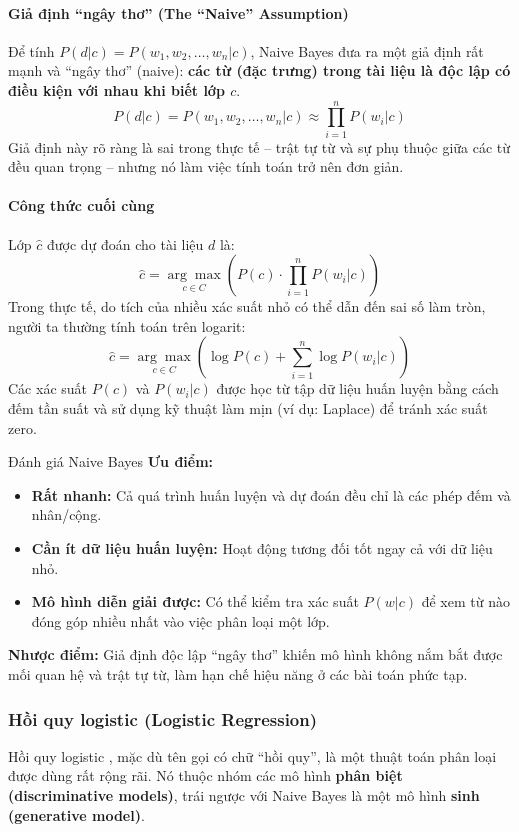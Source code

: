 \paragraph{Giả định “ngây thơ” (The “Naive” Assumption)}
Để tính $P(d|c) = P(w_1, w_2, \dots, w_n | c)$, Naive Bayes đưa ra một giả định rất mạnh và “ngây thơ” (naive): \textbf{các từ (đặc trưng) trong tài liệu là độc lập có điều kiện với nhau khi biết lớp $c$}.
$$ P(d|c) = P(w_1, w_2, \dots, w_n | c) \approx \prod_{i=1}^{n} P(w_i | c) $$
Giả định này rõ ràng là sai trong thực tế -- trật tự từ và sự phụ thuộc giữa các từ đều quan trọng -- nhưng nó làm việc tính toán trở nên đơn giản.

\paragraph{Công thức cuối cùng}
Lớp $\hat{c}$ được dự đoán cho tài liệu $d$ là:
\begin{equation}
    \hat{c} = \underset{c \in C}{\arg\max} \left( P(c) \cdot \prod_{i=1}^{n} P(w_i | c) \right)
    \label{eq:naive_bayes}
\end{equation}
Trong thực tế, do tích của nhiều xác suất nhỏ có thể dẫn đến sai số làm tròn, người ta thường tính toán trên logarit:
$$ \hat{c} = \underset{c \in C}{\arg\max} \left( \log P(c) + \sum_{i=1}^{n} \log P(w_i | c) \right) $$
Các xác suất $P(c)$ và $P(w_i|c)$ được học từ tập dữ liệu huấn luyện bằng cách đếm tần suất và sử dụng kỹ thuật làm mịn (ví dụ: Laplace) để tránh xác suất zero.

\begin{assess}{Đánh giá Naive Bayes}
\textbf{Ưu điểm:}
\begin{itemize}
    \item \textbf{Rất nhanh:} Cả quá trình huấn luyện và dự đoán đều chỉ là các phép đếm và nhân/cộng.
    \item \textbf{Cần ít dữ liệu huấn luyện:} Hoạt động tương đối tốt ngay cả với dữ liệu nhỏ.
    \item \textbf{Mô hình diễn giải được:} Có thể kiểm tra xác suất $P(w|c)$ để xem từ nào đóng góp nhiều nhất vào việc phân loại một lớp.
\end{itemize}
\textbf{Nhược điểm:} Giả định độc lập “ngây thơ” khiến mô hình không nắm bắt được mối quan hệ và trật tự từ, làm hạn chế hiệu năng ở các bài toán phức tạp.
\end{assess}


\subsubsection{Hồi quy logistic (Logistic Regression)}
Hồi quy logistic \cite{hosmer2013applied}, mặc dù tên gọi có chữ “hồi quy”, là một thuật toán phân loại được dùng rất rộng rãi. Nó thuộc nhóm các mô hình \textbf{phân biệt (discriminative models)}, trái ngược với Naive Bayes là một mô hình \textbf{sinh (generative model)}.

